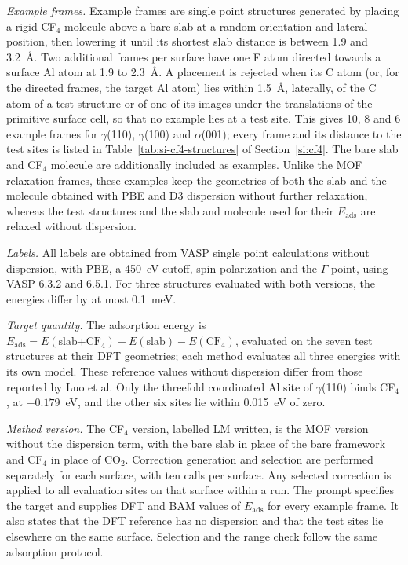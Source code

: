\textit{Example frames.} Example frames are single point structures generated by placing a rigid CF$_4$ molecule above a bare slab at a random orientation and lateral position, then lowering it until its shortest slab distance is between 1.9 and 3.2~\AA. Two additional frames per surface have one F atom directed towards a surface Al atom at 1.9 to 2.3~\AA. A placement is rejected when its C atom (or, for the directed frames, the target Al atom) lies within 1.5~\AA, laterally, of the C atom of a test structure or of one of its images under the translations of the primitive surface cell, so that no example lies at a test site. This gives 10, 8 and 6 example frames for $\gamma$(110), $\gamma$(100) and $\alpha$(001); every frame and its distance to the test sites is listed in Table~\ref{tab:si-cf4-structures} of Section~\ref{si:cf4}. The bare slab and CF$_4$ molecule are additionally included as examples. Unlike the MOF relaxation frames, these examples keep the geometries of both the slab and the molecule obtained with PBE and D3 dispersion without further relaxation, whereas the test structures and the slab and molecule used for their $E_\mathrm{ads}$ are relaxed without dispersion.

\textit{Labels.} All labels are obtained from VASP single point calculations without dispersion, with PBE, a 450~eV cutoff, spin polarization and the $\Gamma$ point, using VASP 6.3.2 and 6.5.1. For three structures evaluated with both versions, the energies differ by at most 0.1~meV.

\textit{Target quantity.} The adsorption energy is $E_\mathrm{ads} = E(\text{slab+CF}_4) - E(\text{slab}) - E(\mathrm{CF_4})$, evaluated on the seven test structures at their DFT geometries; each method evaluates all three energies with its own model. These reference values without dispersion differ from those reported by Luo et al. Only the threefold coordinated Al site of $\gamma$(110) binds CF$_4$, at $-0.179$~eV, and the other six sites lie within 0.015~eV of zero.

\textit{Method version.} The CF$_4$ version, labelled LM written, is the MOF version without the dispersion term, with the bare slab in place of the bare framework and CF$_4$ in place of CO$_2$. Correction generation and selection are performed separately for each surface, with ten calls per surface. Any selected correction is applied to all evaluation sites on that surface within a run. The prompt specifies the target and supplies DFT and BAM values of $E_\mathrm{ads}$ for every example frame. It also states that the DFT reference has no dispersion and that the test sites lie elsewhere on the same surface. Selection and the range check follow the same adsorption protocol.

